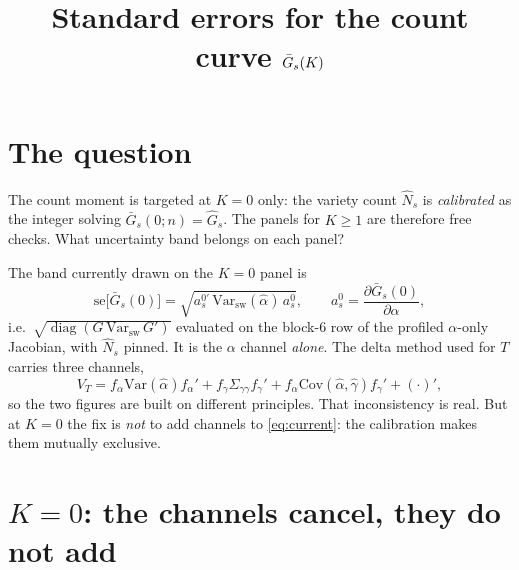 \documentclass[11pt]{article}
\title{Standard errors for the count curve $\Gbar_s(K)$}
\date{}
\newcommand{\Gbar}{\bar{G}}
\newcommand{\Ghat}{\hat{G}}
\newcommand{\ahat}{\hat{\alpha}}
\newcommand{\ghat}{\hat{\gamma}}
\newcommand{\Nhat}{\hat{N}}
\begin{document}
\maketitle

\section{The question}

The count moment is targeted at $K=0$ only: the variety count $\Nhat_s$ is \emph{calibrated}
as the integer solving $\Gbar_s(0;n)=\Ghat_s$. The panels for $K\ge 1$ are therefore free
checks. What uncertainty band belongs on each panel?

The band currently drawn on the $K=0$ panel is
\begin{equation}
\mathrm{se}\big[\Gbar_s(0)\big]
=\sqrt{a_s^{0\prime}\,\mathrm{Var}_{\mathrm{sw}}(\ahat)\,a_s^{0}},
\qquad
a_s^{0}=\frac{\partial \Gbar_s(0)}{\partial\alpha},
\label{eq:current}
\end{equation}
i.e.\ $\sqrt{\operatorname{diag}(G\,\mathrm{Var}_{\mathrm{sw}}\,G')}$ evaluated on the block-6 row
of the profiled $\alpha$-only Jacobian, with $\Nhat_s$ pinned. It is the $\alpha$ channel
\emph{alone}. The delta method used for $T$ carries three channels,
\begin{equation}
V_T=f_\alpha \mathrm{Var}(\ahat) f_\alpha'
   +f_\gamma \Sigma_{\gamma\gamma} f_\gamma'
   +f_\alpha \mathrm{Cov}(\ahat,\ghat) f_\gamma' + (\cdot)',
\label{eq:VT}
\end{equation}
so the two figures are built on different principles. That inconsistency is real. But at
$K=0$ the fix is \emph{not} to add channels to \eqref{eq:current}: the calibration makes them
mutually exclusive.

\section{$K=0$: the channels cancel, they do not add}
\end{document}
